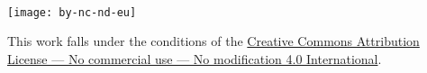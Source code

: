 
\newpage
\thispagestyle{empty}

~\vfill
\begin{center}
    \begin{minipage}[c]{0.25\linewidth}
        \raggedright\texttt{[image: by-nc-nd-eu]}
    \end{minipage}\hfill
\end{center}

\begin{center}
This work falls under the conditions of the 
\href{https://creativecommons.org/licenses/by-nc-nd/4.0}
{%
Creative Commons Attribution License --- No commercial use --- 
No modification 4.0 International}.
\end{center}
